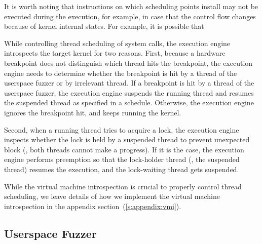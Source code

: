 %
It is worth noting that instructions on which scheduling points
install may not be executed during the execution, for example, in case
that the control flow changes because of kernel internal states.
%
For example, it is possible that

\dr{}




%
While controlling thread scheduling of system calls, the execution
engine introspects the target kernel for two reasons.
%
First, because a hardware breakpoint does not distinguish which thread
hits the breakpoint, the execution engine needs to determine whether
the breakpoint is hit by a thread of the userspace fuzzer or by
irrelevant thread.
%
If a breakpoint is hit by a thread of the userspace fuzzer, the
execution engine suspends the running thread and resumes the suspended
thread as specified in a schedule.
%
Otherwise, the execution engine ignores the breakpoint hit, and keeps
running the kernel.


Second, when a running thread tries to acquire a lock, the execution
engine inspects whether the lock is held by a suspended thread to
prevent unexpected block (\ie, both threads cannot make a progress).
%
If it is the case, the execution engine performs preemption so that
the lock-holder thread (\ie, the suspended thread) resumes the
execution, and the lock-waiting thread gets suspended.


While the virtual machine introspection is crucial to properly control
thread scheduling, we leave details of how we implement the virtual
machine introspection in the appendix
section~(\autoref{s:appendix:vmi}).



\subsection{Userspace Fuzzer}
\label{ss:fuzzer}



